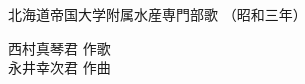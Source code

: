 \documentclass[10pt,b5j]{tarticle} %
\begin{document}
\begin{minipage}[c]{0.7\hsize} %
    \begin{center}
        {\LARGE
            北海道帝国大学附属水産専門部歌 %
        }
        {\small 
            （昭和三年） %
        }
    \end{center}
\end{minipage}
\begin{minipage}[c]{0.3\hsize} %
    \begin{flushright} %
        西村真琴君 作歌\\永井幸次君 作曲 %
    \end{flushright}
\end{minipage}
\end{document}
